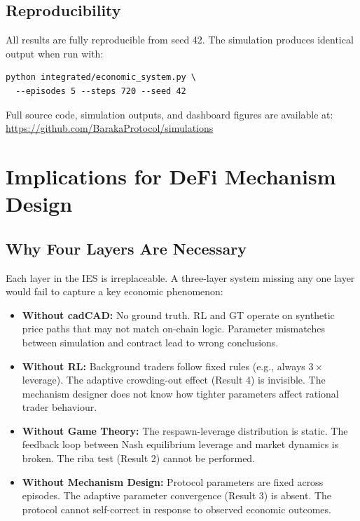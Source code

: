 \documentclass[10pt,twocolumn]{article}
\theoremstyle{plain}
\theoremstyle{definition}
\begin{document}
\subsection{Reproducibility}

All results are fully reproducible from seed 42.
The simulation produces identical output when run with:
\begin{lstlisting}
python integrated/economic_system.py \
  --episodes 5 --steps 720 --seed 42
\end{lstlisting}
Full source code, simulation outputs, and dashboard
figures are available at:
\url{https://github.com/BarakaProtocol/simulations}

\section{Implications for DeFi Mechanism Design}
\label{sec:implications}

\subsection{Why Four Layers Are Necessary}

Each layer in the IES is irreplaceable.  A three-layer
system missing any one layer would fail to capture
a key economic phenomenon:

\begin{itemize}[leftmargin=*,noitemsep]
\item \textbf{Without cadCAD:} No ground truth.  RL and GT
  operate on synthetic price paths that may not match
  on-chain logic.  Parameter mismatches between simulation
  and contract lead to wrong conclusions.

\item \textbf{Without RL:} Background traders follow fixed
  rules (e.g., always $3\times$ leverage).  The adaptive
  crowding-out effect (Result 4) is invisible.  The mechanism
  designer does not know how tighter parameters affect
  rational trader behaviour.

\item \textbf{Without Game Theory:} The respawn-leverage
  distribution is static.  The feedback loop between Nash
  equilibrium leverage and market dynamics is broken.
  The riba test (Result 2) cannot be performed.

\item \textbf{Without Mechanism Design:} Protocol parameters
  are fixed across episodes.  The adaptive parameter
  convergence (Result 3) is absent.  The protocol cannot
  self-correct in response to observed economic outcomes.
\end{itemize}
\end{document}

